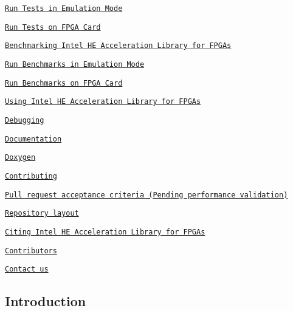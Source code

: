 \begin{DoxyItemize}
\begin{DoxyItemize}
\begin{DoxyItemize}
\item \href{#run-tests-in-emulation-mode}{\tt Run Tests in Emulation Mode}
\item \href{#run-tests-on-fpga-card}{\tt Run Tests on F\-P\-G\-A Card}
\end{DoxyItemize}
\item \href{#benchmarking-intel-he-acceleration-library-for-fpgas}{\tt Benchmarking Intel H\-E Acceleration Library for F\-P\-G\-As}
\begin{DoxyItemize}
\item \href{#run-benchmarks-in-emulation-mode}{\tt Run Benchmarks in Emulation Mode}
\item \href{#run-benchmarks-on-fpga-card}{\tt Run Benchmarks on F\-P\-G\-A Card}
\end{DoxyItemize}
\item \href{#using-intel-he-acceleration-library-for-fpgas}{\tt Using Intel H\-E Acceleration Library for F\-P\-G\-As}
\item \href{#debugging}{\tt Debugging}
\end{DoxyItemize}
\item \href{#documentation}{\tt Documentation}
\begin{DoxyItemize}
\item \href{#doxygen}{\tt Doxygen}
\end{DoxyItemize}
\item \href{#contributing}{\tt Contributing}
\begin{DoxyItemize}
\item \href{#pull-request-acceptance-criteria-pending-performance-validation}{\tt Pull request acceptance criteria (Pending performance validation)}
\item \href{#repository-layout}{\tt Repository layout}
\end{DoxyItemize}
\item \href{#citing-intel-he-acceleration-library-for-fpgas}{\tt Citing Intel H\-E Acceleration Library for F\-P\-G\-As}
\item \href{#contributors}{\tt Contributors}
\item \href{#contact-us}{\tt Contact us}
\end{DoxyItemize}

\subsection*{Introduction}

